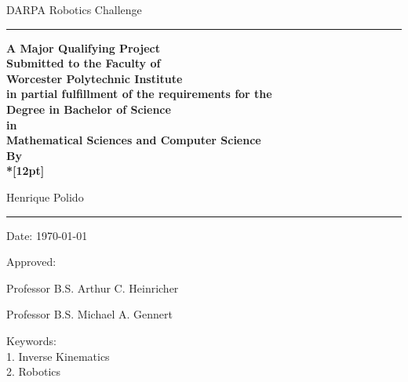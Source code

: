 \documentclass[12pt]{report}
\begin{document}
\rule{0pt}{1.1in}


\begin{center}
{\Huge DARPA Robotics Challenge}

\vspace{0.4in}

\rule{2.1in}{0.1pt}

\vspace{0.5cm}


\textbf{A Major Qualifying Project\\
Submitted to the Faculty of\\
Worcester Polytechnic Institute\\
in partial fulfillment of the requirements for the\\
Degree in Bachelor of Science\\
in\\
Mathematical Sciences
and
Computer Science\\
By
\\*[12pt]}

Henrique Polido\\
\vspace{0.7cm}
\rule{2.1in}{0.1pt}
\vspace{0.5cm}


\end{center}
\vspace{0.5cm}  Date:  \today

\begin{center}
Approved: \vspace{0.5cm}
\end{center}

\hfill \underline{ \hspace{3in}}

\hfill Professor B.S. Arthur C. Heinricher~~

\hfill \underline{ \hspace{3in}}

\hfill Professor B.S. Michael A. Gennert~~

\vspace{ 0.5cm}

\noindent Keywords:\\
1. Inverse Kinematics \\
2. Robotics \\
\end{document}
